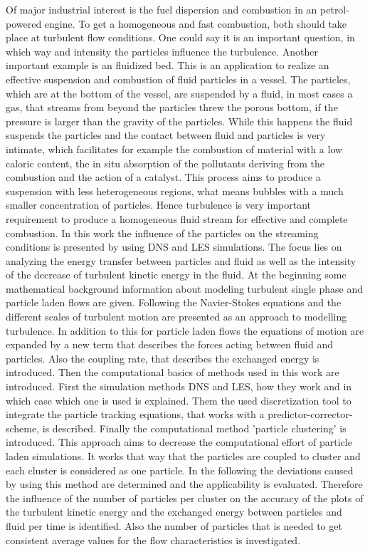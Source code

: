 \documentclass[11pt,a4paper,openany,oneside,parskip=half*]{article}
\begin{document}
Of major industrial interest is the fuel dispersion and combustion in an petrol-powered engine. To get a homogeneous and fast combustion, both should take place at turbulent flow conditions. One could say it is an important question, in which way and intensity the particles influence the turbulence.
\newline
Another important example is an fluidized bed. This is an application to realize an effective suspension and combustion of fluid particles in a vessel. The particles, which are at the bottom of the vessel, are suspended by a fluid, in most cases a gas, that streams from beyond the particles threw the porous bottom, if the pressure is larger than the gravity of the particles. While this happens the fluid suspends the particles and the contact between fluid and particles is very intimate, which facilitates for example the combustion of material with a low caloric content, the in situ absorption of the pollutants deriving from the combustion and the action of a catalyst. This process aims to produce a suspension with less heterogeneous regions, what means bubbles with a much smaller concentration of particles. Hence turbulence is very important requirement to produce a homogeneous fluid stream for effective and complete combustion.
\newline
In this work the influence of the particles on the streaming conditions is presented by using DNS and LES simulations. The focus lies on analyzing the energy transfer between particles and fluid as well as the intensity of the decrease of turbulent kinetic energy in the fluid.  
At the beginning some mathematical background information about modeling turbulent single phase and particle laden flows are given. 
Following the Navier-Stokes equations and the different scales of turbulent motion are presented as an approach to modelling turbulence. In addition to this for particle laden flows the equations of motion are expanded by a new term that describes the forces acting between fluid and particles. 
Also the coupling rate, that describes the exchanged energy is introduced.
Then the computational basics of methods used in this work are introduced. First the simulation methods DNS and LES, how they work and in which case which one is used is explained.
Them the used discretization tool to integrate the particle tracking equations, that works with a predictor-corrector-scheme, is described.     
Finally the computational method 'particle clustering' is introduced. This approach aims to decrease the computational effort of particle laden simulations. It works that way that the particles are coupled to cluster and each cluster is considered as one particle.
\newline
In the following the deviations caused by using this method are determined and the applicability is evaluated. Therefore the influence of the number of particles per cluster on the accuracy of the plots of the turbulent kinetic energy and the exchanged energy between particles and fluid per time is identified.
Also the number of particles that is needed to get consistent average values for the flow characteristics is investigated.
\pagebreak
\end{document}
